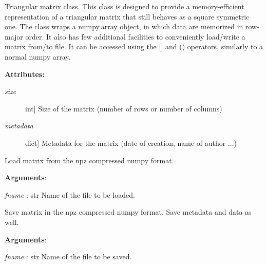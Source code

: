 \documentclass[letterpaper,10pt,english]{sphinxmanual}
\begin{document}
\begin{fulllineitems}
\label{index:encore.utils.TriangularMatrix}
Triangular matrix class. This class is designed to provide a memory-efficient representation of a triangular matrix that still behaves as a square symmetric one. The class wraps a numpy.array object, in which data are memorized in row-major order. It also has few additional facilities to conveniently load/write a matrix from/to file. It can be accessed using the {[}{]} and () operators, similarly to a normal numpy array.

\textbf{Attributes:}
\begin{description}
\item[{\emph{size}}] \leavevmode{[}int{]}
Size of the matrix (number of rows or number of columns)

\item[{\emph{metadata}}] \leavevmode{[}dict{]}
Metadata for the matrix (date of creation, name of author ...)

\end{description}

\begin{fulllineitems}
\label{index:encore.utils.TriangularMatrix.loadz}
Load matrix from the npz compressed numpy format.

\textbf{Arguments}:

\emph{fname} : str
Name of the file to be loaded.

\end{fulllineitems}


\begin{fulllineitems}
\label{index:encore.utils.TriangularMatrix.savez}
Save matrix in the npz compressed numpy format. Save metadata and data as well.

\textbf{Arguments}:

\emph{fname} : str
Name of the file to be saved.

\end{fulllineitems}



\end{fulllineitems}
\end{document}
